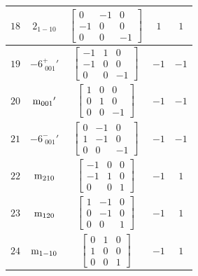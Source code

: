 \documentclass[fleqn,8pt]{jsarticle}
\begin{document}
\begin{longtable}{ccccc}
$ 18 $ & $ 2{}_{1-10} $ & $ \begin{bmatrix} 0 & -1 & 0 \\ -1 & 0 & 0 \\ 0 & 0 & -1 \end{bmatrix} $ & $ 1 $ & $ 1 $ \\ \hline
$ 19 $ & $ -6^{+}_{\,\,001}{}' $ & $ \begin{bmatrix} -1 & 1 & 0 \\ -1 & 0 & 0 \\ 0 & 0 & -1 \end{bmatrix} $ & $ -1 $ & $ -1 $ \\ \hline
$ 20 $ & $ {\rm m}_{001}{}' $ & $ \begin{bmatrix} 1 & 0 & 0 \\ 0 & 1 & 0 \\ 0 & 0 & -1 \end{bmatrix} $ & $ -1 $ & $ -1 $ \\ \hline
$ 21 $ & $ -6^{-}_{\,\,001}{}' $ & $ \begin{bmatrix} 0 & -1 & 0 \\ 1 & -1 & 0 \\ 0 & 0 & -1 \end{bmatrix} $ & $ -1 $ & $ -1 $ \\ \hline
$ 22 $ & $ {\rm m}_{210} $ & $ \begin{bmatrix} -1 & 0 & 0 \\ -1 & 1 & 0 \\ 0 & 0 & 1 \end{bmatrix} $ & $ -1 $ & $ 1 $ \\ \hline
$ 23 $ & $ {\rm m}_{120} $ & $ \begin{bmatrix} 1 & -1 & 0 \\ 0 & -1 & 0 \\ 0 & 0 & 1 \end{bmatrix} $ & $ -1 $ & $ 1 $ \\ \hline
$ 24 $ & $ {\rm m}_{1-10} $ & $ \begin{bmatrix} 0 & 1 & 0 \\ 1 & 0 & 0 \\ 0 & 0 & 1 \end{bmatrix} $ & $ -1 $ & $ 1 $ \\
\end{longtable}
\end{document}

